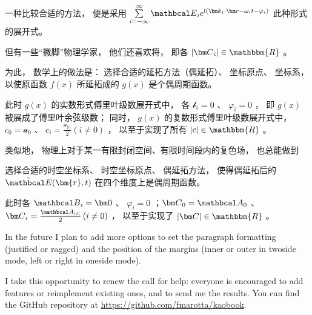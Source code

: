 一种比较合适的方法， 便是采用 $ \sum\limits_{i =  - \infty }^\infty  {{{\mathbcal E}_i}{e^{{\mathrm i}({{\bm k}_i} \cdot {\bm r} - {\omega _i}t - \varphi_i)}}} $ 
此种形式的展开式。

但有一些“撇脚”物理学家， 他们还喜欢将， 即各
$ \left| {\bm C}_i \right| \in \mathbbm{R} $ 。 

为此， 数学上的做法是： 选择合适的延拓方法（偶延拓）、 坐标原点、 坐标系， 以使原函数 $ f(x) $ 所延拓成的
 $ g(x) $ 是个偶周期函数。 

此时 $ g(x) $ 的实数形式傅里叶级数展开式中， 各 $ {\mathcal b}_i = 0 $ 、 $ \varphi_i = 0 $ ， 
即 $ g(x) $ 被展成了傅里叶余弦级数； 同时， $ g(x) $ 的复数形式傅里叶级数展开式中， 
$ c_0 = {\mathcal a}_0 $ 、 $ c_i = \frac{{\mathcal a}_{\left| i \right|}}{2} \left( {i \ne 0} \right) $ 
， 以至于实现了所有 $ \left| c \right| \in \mathbbm{R} $ 。

类似地， 物理上对于某一有限封闭空间、有限时间段内的复色场， 也总能做到

选择合适的时空坐标系、 时空坐标原点、 偶延拓方法， 
使得偶延拓后的 $ \tilde {{\mathbcal E}}(\bm{r},t) $ 在四个维度上是偶周期函数。 

此时各 $ {\mathbcal B}_i = {\bm 0} $ 、 $ \varphi_i = 0 $ ；$ {\bm C}_0 = {\mathbcal A}_0 $ 、 
$ {\bm C}_i = \frac{{\mathbcal A}_{\left| i \right|}}{2} \left( {i \ne 0} \right) $ ， 以至于实现了 
$ \left| {\bm C} \right| \in \mathbbm{R} $ 。

In the future I plan to add more options to set the paragraph formatting
(justified or ragged) and the position of the margins (inner or outer in
twoside mode, left or right in oneside mode).

I take this opportunity to renew the call for help: everyone is
encouraged to add features or reimplement existing ones, and to send me
the results. You can find the GitHub repository at
\url{https://github.com/fmarotta/kaobook}.

